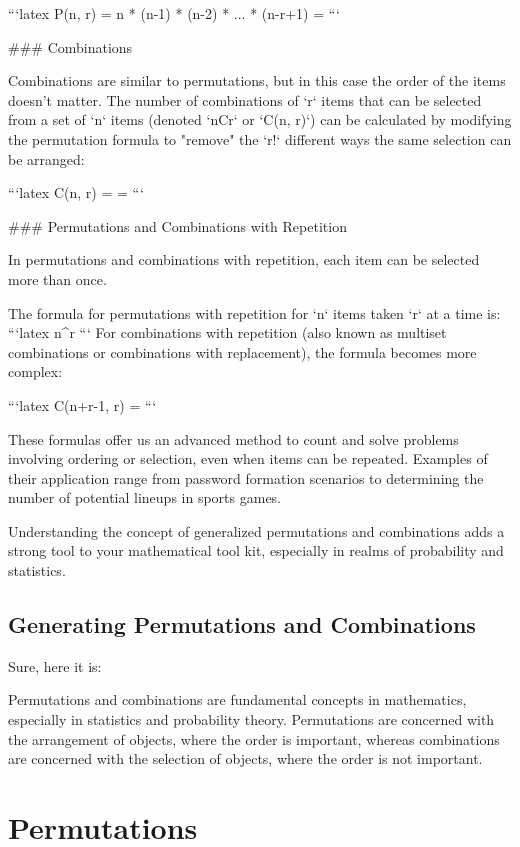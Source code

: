   ```latex
  P(n, r) = n * (n-1) * (n-2) * ... * (n-r+1) = 
  ```
  
### Combinations

Combinations are similar to permutations, but in this case the order of the items doesn't matter. The number of combinations of `r` items that can be selected from a set of `n` items (denoted `nCr` or `C(n, r)`) can be calculated by modifying the permutation formula to "remove" the `r!` different ways the same selection can be arranged:

 ```latex
 C(n, r) =  = 
 ```
 
### Permutations and Combinations with Repetition

In permutations and combinations with repetition, each item can be selected more than once. 

The formula for permutations with repetition for `n` items taken `r` at a time is: 
```latex
n^r
```
For combinations with repetition (also known as multiset combinations or combinations with replacement), the formula becomes more complex:

```latex
C(n+r-1, r) = 
```

These formulas offer us an advanced method to count and solve problems involving ordering or selection, even when items can be repeated. Examples of their application range from password formation scenarios to determining the number of potential lineups in sports games. 

Understanding the concept of generalized permutations and combinations adds a strong tool to your mathematical tool kit, especially in realms of probability and statistics.

\subsection{Generating Permutations and Combinations}
Sure, here it is:

Permutations and combinations are fundamental concepts in mathematics, especially in statistics and probability theory. Permutations are concerned with the arrangement of objects, where the order is important, whereas combinations are concerned with the selection of objects, where the order is not important.

\section{Permutations}

